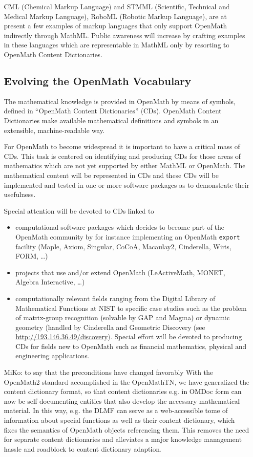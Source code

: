 \documentclass{euproposal}
\begin{document}
CML (Chemical Markup Language) and STMML (Scientific, Technical and Medical Markup
Language), RoboML (Robotic Markup Language), are at present a few examples of
markup languages that only support OpenMath indirectly through MathML.  Public
awareness will increase by crafting examples in these languages which are
representable in MathML only by resorting to OpenMath Content Dictionaries.

\subsection{Evolving the OpenMath Vocabulary}\label{sec:OCD}

The mathematical knowledge is provided in OpenMath by means of
symbols, defined in ``OpenMath Content Dictionaries'' (CDs).  OpenMath
Content Dictionaries make available mathematical definitions and
symbols in an extensible, machine-readable way.

For OpenMath to become widespread it is important to have a critical
mass of CDs. This task is centered on identifying and producing CDs
for those areas of mathematics which are not yet supported by either
MathML or OpenMath. The mathematical content will be represented in
CDs and these CDs will be implemented and tested in one or more
software packages as to demonstrate their usefulness.

Special attention will be devoted to CDs linked to 
\begin{itemize}
\item computational software packages which decides to become part of the OpenMath
  community by for instance implementing an OpenMath \texttt{export} facility
  (Maple, Axiom, Singular, CoCoA, Macaulay2, Cinderella, Wiris, FORM, \ldots)
\item projects that use and/or extend OpenMath (LeActiveMath, MONET, Algebra
  Interactive, \ldots)
\item computationally relevant fields ranging from the Digital Library of
  Mathematical Functions at NIST to specific case studies such as the problem of
  matrix-group recognition (solvable by GAP and Magma) or dynamic geometry
  (handled by Cinderella and Geometric Discovery (see
  {\url{http://193.146.36.49/discovery}}). Special effort will be devoted to
  producing CDs for fields new to OpenMath such as financial mathematics, physical
  and engineering applications.
\end{itemize}
\begin{newpart}{MiKo: to say that the preconditions have changed favorably}
  With the OpenMath2 standard accomplished in the OpenMathTN, we have generalized
  the content dictionary format, so that content dictionaries e.g. in OMDoc form
  can now be self-documenting entities that also develop the necessary
  mathematical material. In this way, e.g. the DLMF can serve as a web-accessible
  tome of information about special functions as well as their content dictionary,
  which fixes the semantics of OpenMath objects referencing them. This removes the
  need for separate content dictionaries and alleviates a major knowledge
  management hassle and roadblock to content dictionary adaption.
\end{newpart}
\end{document}
